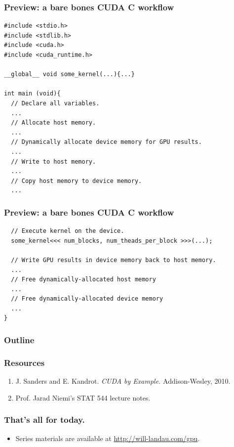 \documentclass[handout]{beamer}
\numberwithin{equation}{section}
\begin{document}
\begin{frame}[fragile]
\frametitle{Preview: a bare bones CUDA C workflow}
\begin{lstlisting}
#include <stdio.h> 
#include <stdlib.h> 
#include <cuda.h>
#include <cuda_runtime.h> 

__global__ void some_kernel(...){...}

int main (void){ 
  // Declare all variables.
  ...
  // Allocate host memory.
  ...
  // Dynamically allocate device memory for GPU results.
  ...
  // Write to host memory.
  ... 
  // Copy host memory to device memory.
  ...
\end{lstlisting}
\end{frame}



\begin{frame}[fragile]
\frametitle{Preview: a bare bones CUDA C workflow}
\begin{lstlisting}
  // Execute kernel on the device.
  some_kernel<<< num_blocks, num_theads_per_block >>>(...);
  
  // Write GPU results in device memory back to host memory.
  ...
  // Free dynamically-allocated host memory
  ...
  // Free dynamically-allocated device memory    
  ...
}
\end{lstlisting}
\end{frame}

\begin{frame}
\frametitle{Outline}
\tableofcontents
\end{frame}

\begin{frame}
\frametitle{Resources}
\begin{enumerate}[1. ]
\item J. Sanders and E. Kandrot. \emph{CUDA by Example.} Addison-Wesley, 2010.
\pause \item Prof. Jarad Niemi's STAT 544 lecture notes.
\end{enumerate}
\end{frame}

\begin{frame}
\frametitle{That's all for today.}
\begin{itemize}
\item Series materials are available at \url{http://will-landau.com/gpu}.
\end{itemize}
\end{frame}
\end{document}
